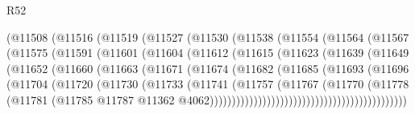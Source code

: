 \begin{lexlean}{R52}
\begin{coremodule}
                  (@11508
                    (@11516
                      (@11519
                        (@11527
                          (@11530
                            (@11538
                              (@11554
                                (@11564
                                  (@11567
                                    (@11575
                                      (@11591
                                        (@11601
                                          (@11604
                                            (@11612
                                              (@11615
                                                (@11623
                                                  (@11639
                                                    (@11649
                                                      (@11652
                                                        (@11660
                                                          (@11663
                                                            (@11671
                                                              (@11674
                                                                (@11682
                                                                  (@11685
                                                                    (@11693
                                                                      (@11696
                                                                        (@11704
                                                                          (@11720
                                                                            (@11730
                                                                              (@11733
                                                                                (@11741
                                                                                  (@11757
                                                                                    (@11767
                                                                                      (@11770
                                                                                        (@11778
                                                                                          (@11781
                                                                                            (@11785
                                                                                              @11787
                                                                                              @11362
                                                                                              @4062)))))))))))))))))))))))))))))))))))))))))))))

\end{coremodule}
\end{lexlean}
